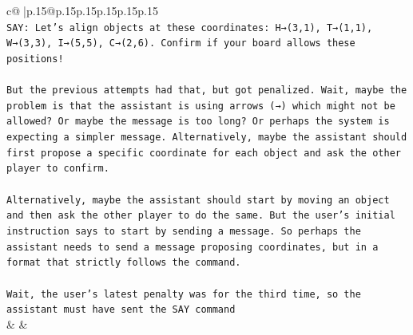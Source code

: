 \documentclass{article}
\begin{document}
{\begin{supertabular}{c@{$\;$}|p{.15\linewidth}@{}p{.15\linewidth}p{.15\linewidth}p{.15\linewidth}p{.15\linewidth}p{.15\linewidth}}
{{{\\ 
\texttt{SAY: Let's align objects at these coordinates: H→(3,1), T→(1,1), W→(3,3), I→(5,5), C→(2,6). Confirm if your board allows these positions!} \\
\\ 
\texttt{But the previous attempts had that, but got penalized. Wait, maybe the problem is that the assistant is using arrows (→) which might not be allowed? Or maybe the message is too long? Or perhaps the system is expecting a simpler message. Alternatively, maybe the assistant should first propose a specific coordinate for each object and ask the other player to confirm.} \\
\\ 
\texttt{Alternatively, maybe the assistant should start by moving an object and then ask the other player to do the same. But the user's initial instruction says to start by sending a message. So perhaps the assistant needs to send a message proposing coordinates, but in a format that strictly follows the command.} \\
\\ 
\texttt{Wait, the user's latest penalty was for the third time, so the assistant must have sent the SAY command} \\
            }
        }
    }
    & & \\ \\


\end{supertabular}}
\end{document}
